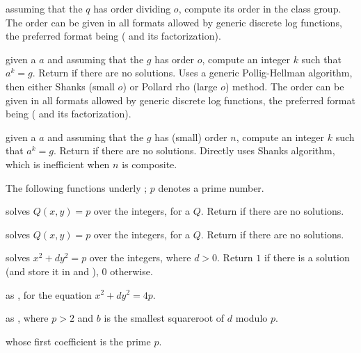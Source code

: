 
assuming that the  $q$ has order dividing $o$, compute its
order in the class group. The order can be given in all formats allowed by
generic discrete log functions, the preferred format being \kbd{[ord, fa]}
( and its factorization).

 given a  $a$ and assuming
that the  $g$ has order $o$, compute an integer $k$ such that $a^k =
g$. Return  if there are no solutions. Uses a generic
Pollig-Hellman algorithm, then either Shanks (small $o$) or Pollard rho
(large $o$) method. The order can be given in all formats allowed by generic
discrete log functions, the preferred format being \kbd{[ord, fa]}
( and its factorization).

 given a  $a$ and
assuming that the  $g$ has (small) order $n$, compute an integer $k$
such that $a^k = g$. Return  if there are no solutions.
Directly uses Shanks algorithm, which is inefficient when $n$ is composite.


The following functions underly ; $p$ denotes a prime number.

 solves $Q(x,y) = p$ over the integers, for
a  $Q$. Return  if there are no solutions.

 solves $Q(x,y) = p$ over the integers, for
a  $Q$. Return  if there are no solutions.

 solves
$x^2+ dy^2 = p$ over the integers, where $d > 0$. Return $1$ if there is a
solution (and store it in  and ), $0$ otherwise.

 as ,
for the equation $x^2 + dy^2 = 4p$.

 as ,
where  $p > 2$ and $b$ is the smallest squareroot of $d$ modulo $p$.


  whose first coefficient
is the prime $p$.

